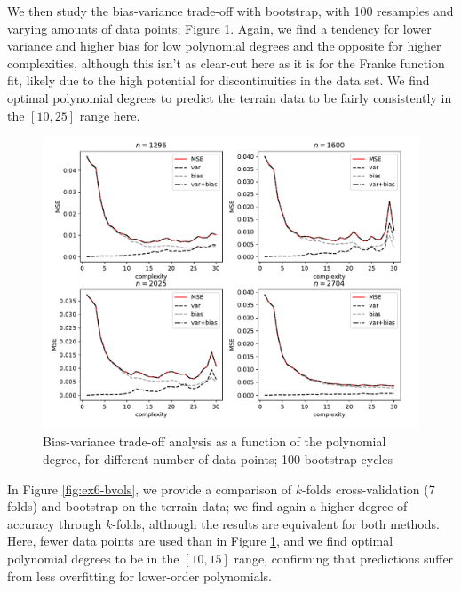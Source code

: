 \documentclass[10pt, a4paper]{article}
\begin{document}
    We then study the bias-variance trade-off with bootstrap, with 100 resamples and varying amounts of data points; Figure \ref{fig:ex6-bv}. Again, we find a tendency for lower variance and higher bias for low polynomial degrees and the opposite for higher complexities, although this isn't as clear-cut here as it is for the Franke function fit, likely due to the high potential for discontinuities in the data set. We find optimal polynomial degrees to predict the terrain data to be fairly consistently in the $[10, 25]$ range here.
    
    \begin{figure}[h] %
        \centering
        \includegraphics[scale=0.6]{ex6_bias_var_bsc_100_noise_1.0.pdf}
        \caption{Bias-variance trade-off analysis as a function of the polynomial degree, for different number of data points; 100 bootstrap cycles}
        \label{fig:ex6-bv}
    \end{figure}
    
    In Figure \ref{fig:ex6-bvols}, we provide a comparison of $k$-folds cross-validation (7 folds) and bootstrap on the terrain data; we find again a higher degree of accuracy through $k$-folds, although the results are equivalent for both methods. Here, fewer data points are used than in Figure \ref{fig:ex6-bv}, and we find optimal polynomial degrees to be in the $[10, 15]$ range, confirming that predictions suffer from less overfitting for lower-order polynomials.
    
\end{document}

